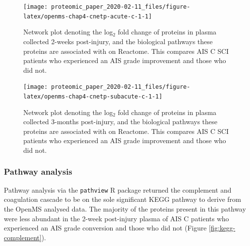 \documentclass[9pt,lineno]{elife}
\begin{document}
\begin{landscape}



\begin{figure}

{\centering \texttt{[image: proteomic\_paper\_2020-02-11\_files/figure-latex/openms-chap4-cnetp-acute-c-1-1]} 

}

\caption{Network plot denoting the log\(_2\) fold change of proteins in plasma collected 2-weeks post-injury, and the biological pathways these proteins are associated with on Reactome. This compares AIS C SCI patients who experienced an AIS grade improvement and those who did not.}\label{fig:openms-chap4-cnetp-acute-c-1}
\end{figure}

\end{landscape}
\begin{landscape}



\begin{figure}

{\centering \texttt{[image: proteomic\_paper\_2020-02-11\_files/figure-latex/openms-chap4-cnetp-subacute-c-1-1]} 

}

\caption{Network plot denoting the log\(_2\) fold change of proteins in plasma collected 3-months post-injury, and the biological pathways these proteins are associated with on Reactome. This compares AIS C SCI patients who experienced an AIS grade improvement and those who did not.}\label{fig:openms-chap4-cnetp-subacute-c-1}
\end{figure}

\end{landscape}
\clearpage

\hypertarget{kegg-chap3}{%
\subsubsection{Pathway analysis}\label{kegg-chap3}}

Pathway analysis via the \texttt{pathview} R package returned the complement and coagulation cascade to be on the sole significant KEGG pathway to derive from the OpenMS analysed data.
The majority of the proteins present in this pathway were less abundant in the 2-week post-injury plasma of AIS C patients who experienced an AIS grade conversion and those who did not (Figure \ref{fig:kegg-complement}).
\end{document}
